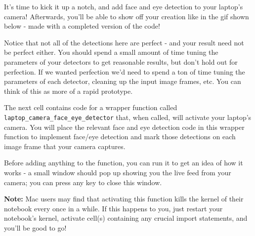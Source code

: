 \documentclass[11pt]{article}
\begin{document}
It's time to kick it up a notch, and add face and eye detection to your
laptop's camera! Afterwards, you'll be able to show off your creation
like in the gif shown below - made with a completed version of the code!

Notice that not all of the detections here are perfect - and your result
need not be perfect either. You should spend a small amount of time
tuning the parameters of your detectors to get reasonable results, but
don't hold out for perfection. If we wanted perfection we'd need to
spend a ton of time tuning the parameters of each detector, cleaning up
the input image frames, etc. You can think of this as more of a rapid
prototype.

The next cell contains code for a wrapper function called
\texttt{laptop\_camera\_face\_eye\_detector} that, when called, will
activate your laptop's camera. You will place the relevant face and eye
detection code in this wrapper function to implement face/eye detection
and mark those detections on each image frame that your camera captures.

Before adding anything to the function, you can run it to get an idea of
how it works - a small window should pop up showing you the live feed
from your camera; you can press any key to close this window.

\textbf{Note:} Mac users may find that activating this function kills
the kernel of their notebook every once in a while. If this happens to
you, just restart your notebook's kernel, activate cell(s) containing
any crucial import statements, and you'll be good to go!
\end{document}
